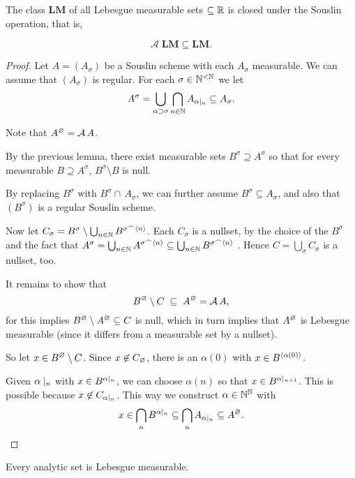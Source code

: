 \begin{proposition}\label{prop-souslin-lebesgue}The class $\mathbf{LM}$ of all Lebesgue measurable sets $\subseteq \mathbb{R}$ is closed under the Souslin operation, that is,

\begin{equation}
\mathcal{A} \; \mathbf{LM} \subseteq  \mathbf{LM}.
\end{equation}

\end{proposition}\begin{proof}Let $A = (A_\sigma)$ be a Souslin scheme with each $A_\sigma$ measurable. We can assume that $(A_\sigma)$ is regular. For each $\sigma \in \mathbb{N}^{<\mathbb{N}}$ we let
\begin{equation*}
A^\sigma = \bigcup_{\alpha \supset \sigma} \bigcap_{n \in \mathbb{N}} A_{\alpha\mid_{n}} \subseteq A_\sigma.
\end{equation*}

Note that $A^\varnothing = \mathcal{A}\, A$.

By the previous lemma, there exist measurable sets $B^\sigma \supseteq A^\sigma$ so that for every measurable $B \supseteq A^\sigma$, $B^\sigma \setminus B$ is null.

By replacing $B^\sigma$ with $B^\sigma \cap \, A_\sigma$, we can further assume $B^\sigma \subseteq A_\sigma$, and also that $(B^\sigma)$ is a regular Souslin scheme.

Now let $C_\sigma = B^\sigma \setminus \bigcup_{n \in \mathbb{N}} B^{\sigma\mbox{}^\frown\langle n \rangle}$. Each $C_\sigma$ is a nullset, by the choice of the $B^\sigma$ and the fact that  $A^\sigma = \bigcup_{n \in \mathbb{N}} A^{\sigma\mbox{}^\frown\langle n \rangle} \subseteq \bigcup_{n \in \mathbb{N}} B^{\sigma\mbox{}^\frown\langle n \rangle}$ . Hence $C= \bigcup_{\sigma} C_\sigma$ is a nullset, too.

It remains to show that
\begin{equation*}
B^\varnothing \setminus C \; \subseteq \;  A^\varnothing = \mathcal{A}\, A,
\end{equation*}
for this implies $B^\varnothing \setminus A^\varnothing \subseteq C$ is null, which in turn implies that $A^\varnothing$ is Lebesgue measurable (since it differs from a measurable set by a nullset).

So let $x \in B^\varnothing \setminus C$. Since $x \not \in C_\varnothing$, there is an $\alpha(0)$ with $x \in B^{\langle \alpha(0) \rangle}$.

Given $\alpha\mid_{n}$ with $x \in B^{\alpha\mid_{n}}$, we can choose $\alpha(n)$ so that $x \in B^{\alpha\mid_{n+1}}$. This is possible because $x \not \in C_{\alpha\mid_{n}}$. This way we construct $\alpha \in \mathbb{N}^{\mathbb{N}}$ with
\begin{equation*}
x \in \bigcap_n B^{\alpha\mid_{n}} \subseteq  \bigcap_n A_{\alpha\mid_{n}} \subseteq A^\varnothing.
\end{equation*}
\end{proof}\begin{corollary}\label{cor-analytic-measurable}Every analytic set is Lebesgue measurable.


\end{corollary}
